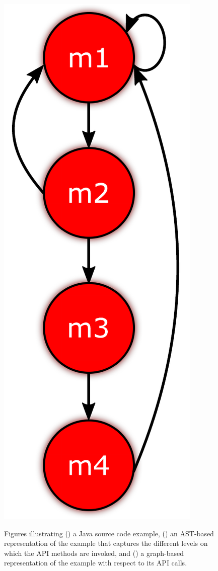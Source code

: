 \begin{figure}[t]
{\begin{subfloatrow}[3]
    {\includegraphics[scale=0.25]{images/graph.pdf}}
  \end{subfloatrow}
}
{\caption[Representing the API method calls as a graph]{Figures illustrating () a Java source code example, () an AST-based representation of the example that captures the different levels on which the API methods are invoked, and () a graph-based representation of the example with respect to its API calls.}
\label{fig:graph}}
\end{figure}
 
